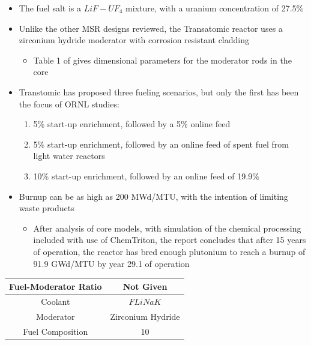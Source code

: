 \documentclass[letterpaper]{article}
\begin{document}
\begin{itemize}
\item The fuel salt is a $LiF - UF_4$ mixture, with a uranium concentration of 27.5\%
\item Unlike the other MSR designs reviewed, the Transatomic reactor uses a zirconium hydride moderator with corrosion resistant cladding
	\begin{itemize}
	\item Table 1 of \cite{robertson_assessment_2017} gives dimensional parameters for the moderator rods in the core
	\end{itemize}
\item Transtomic has proposed three fueling scenarios, but only the first has been the focus of ORNL studies:
	\begin{enumerate}
	\item 5\% start-up enrichment, followed by a 5\% online feed
	\item 5\% start-up enrichment, followed by an online feed of spent fuel from light water reactors
	\item 10\% start-up enrichment, followed by an online feed of 19.9\%
	\end{enumerate}
\item Burnup can be as high as 200 MWd/MTU, with the intention of limiting waste products
	\begin{itemize}
	\item After analysis of core models, with simulation of the chemical processing included with use of ChemTriton, the report concludes that after 15 years of operation, the reactor has bred enough plutonium to reach a burnup of 91.9 GWd/MTU by year 29.1 of operation
	\end{itemize}
\end{itemize}

\begin{center}
\begin{tabular}{|c|c|}
\hline
Fuel-Moderator Ratio & Not Given \\
\hline
Coolant & $FLiNaK$ \\
\hline
Moderator & Zirconium Hydride \\
\hline
Fuel Composition & 10 \\
\hline
\end{tabular}
\end{center}




\end{document}
